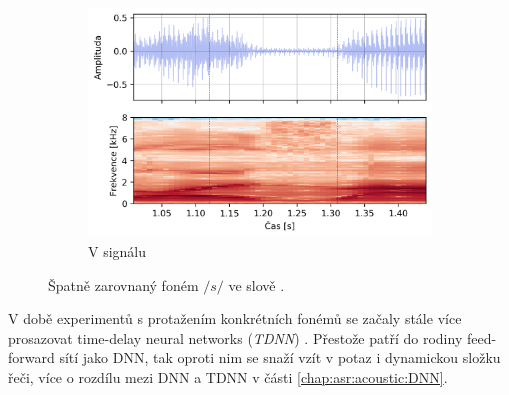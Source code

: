 \begin{figure}[htpb]
\begin{subfigure}[b]{0.65\textwidth}
    \includegraphics[width=\textwidth]{./ch6-realisation/img/energy_spec_word-segment.png}
    \caption{V signálu}
    \label{fig:realisation:augmentation:alignemnt:wrong:audio}
  \end{subfigure}
  \caption{Špatně zarovnaný foném $/s/$ ve slově .}
  \label{fig:realisation:augmentation:alignemnt:wrong}
\end{figure}


V době experimentů s protažením konkrétních fonémů se začaly stále více prosazovat time-delay neural networks (\textit{TDNN}) . Přestože patří do rodiny feed-forward sítí jako DNN, tak oproti nim se snaží vzít v potaz i dynamickou složku řeči, více o rozdílu mezi DNN a TDNN v části \ref{chap:asr:acoustic:DNN}.


